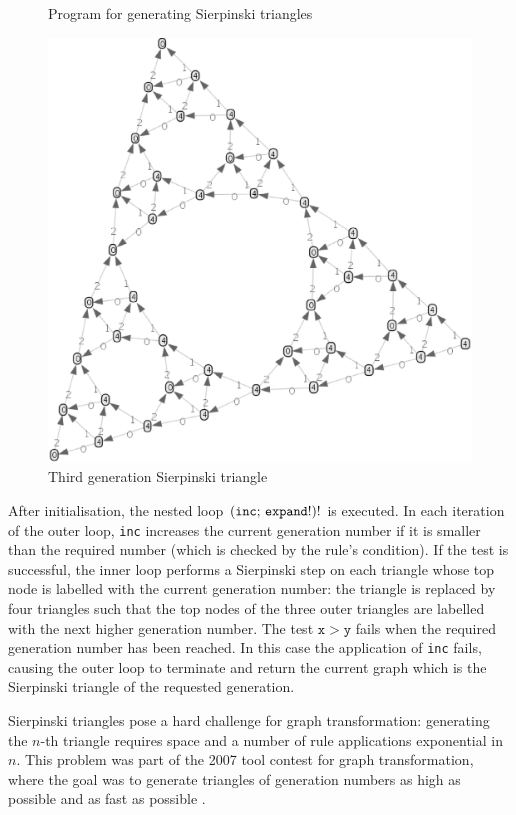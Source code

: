 \begin{figure}[p]
\begin{center}

\end{center}
\caption{Program for generating Sierpinski triangles}\label{fig:Sierpinski-program}
 \begin{center}
  \includegraphics[scale=.35,angle=-15]{sierpinski-3.eps}
 \end{center}
\vspace*{-2.5cm}
\caption{Third generation Sierpinski triangle \label{fig:sierpinski}}
\end{figure}

After initialisation, the nested loop $\mathtt{(inc;\, expand!)!}$ is executed. In each iteration of the outer loop, \texttt{inc} increases the current generation number if it is smaller than the required number (which is checked by the rule's condition). If the test is successful, the inner loop  performs a Sierpinski step on each triangle whose top node is labelled with the current generation number: the triangle is replaced by four triangles such that the top nodes of the three outer triangles are labelled with the next higher generation number. The test $\mathtt{x > y}$ fails when the required generation number has been reached. In this case the application of \texttt{inc} fails, causing the outer loop to terminate and return the current graph which is the Sierpinski triangle of the requested generation.

Sierpinski triangles pose a hard challenge for graph transformation: generating the $n$-th triangle requires space and a number of rule applications exponential in $n$. This problem was part of the 2007 tool contest for graph transformation, where the goal was to generate triangles of generation numbers as high as possible and as fast as possible \cite{Taentzer_et_al08a}.
